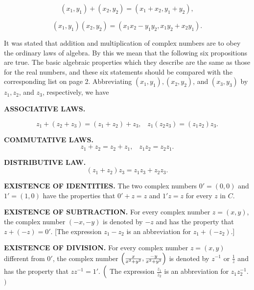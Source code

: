 \begin{equation}
(x_{1}, y_{1}) + (x_{2}, y_{2}) = (x_{1} + x_{2}, y_{1} + y_{2}),  
\label{eq6.6.3}
\end{equation}

\begin{equation}
(x_{1}, y_{1})(x_{2}, y_{2}) = (x_{1}x_{2} - y_{1}y_{2}, x_{1}y_{2} + x_{2}y_{1}).  
\label{eq6.6.4}
\end{equation}

It was stated that addition and multiplication of complex numbers are to obey the ordinary laws
of algebra. By this we mean that the following six propositions are true. The basic algebraic
properties which they describe
are the same as those for the real numbers, and these six statements should be compared with
the corresponding list on page 2. Abbreviating $(x_{1}, y_{1}), (x_{2}, y_{2})$, and $(x_{3}, y_{3})$ by $z_{1}, z_{2}$, and $z_{3}$, respectively, we have

\begin{theorem} %
\textbf{ASSOCIATIVE LAWS.}

$$
z_{1} + (z_{2} + z_{3}) = (z_{1} + z_{2}) + z_{3},\;\;\;  z_1(z_{2}z_{3}) = (z_{1}z_{2})z_{3}.
$$
\end{theorem}

\begin{theorem} %
\textbf{COMMUTATIVE LAWS.}
$$
z_{1} + z_{2} = z_{2} + z_{1},\;\;\; z_{1}z_{2} = z_{2}z_{1}.
$$
\end{theorem}

\begin{theorem} %
\textbf{DISTRIBUTIVE LAW.}
$$
(z_1 + z_2)z_3 = z_{1}z_{3} + z_{2}z_{3}. 
$$
\end{theorem}

\begin{theorem} %
\textbf{EXISTENCE OF IDENTITIES.} 
The two complex numbers $0' = (0, 0)$ and $1' = (1, 0)$ have the properties that $0' + z = z$ 
and $1'z = z$ for every $z$ in $C$.
\end{theorem}

\begin{theorem} %
\textbf{EXISTENCE OF SUBTRACTION.} 
For every complex number $z = (x, y)$, the complex number $(-x, -y)$ is denoted by $-z$ and has the property that $z + (-z) = 0'$. [The expression $z_1 - z_2$ is an abbreviation for $z_{1} + (-z_{2}).$]
\end{theorem}

\begin{theorem} %
\textbf{EXISTENCE OF DIVISION.}
For every complex number $z = (x, y)$ different from $0'$, the complex number $\Bigl(\frac{x}{x^2 + y^2}, \frac{-y}{x^2 + y^2}\Bigr)$ is denoted by $z^{-1}$ or $\frac{1}{z}$ and has the property that $zz^{-1} = 1'$. $\Bigl($ The expression $\frac{z_1}{z_2}$ is an abbreviation for 
$z_{1}z_{2}^{-1}$. $\Bigr)$
\end{theorem}


